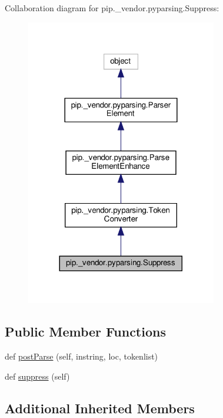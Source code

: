 Collaboration diagram for pip.\+\_\+vendor.\+pyparsing.\+Suppress\+:
\nopagebreak
\begin{figure}[H]
\begin{center}
\leavevmode
\includegraphics[width=236pt]{classpip_1_1__vendor_1_1pyparsing_1_1Suppress__coll__graph}
\end{center}
\end{figure}
\subsection*{Public Member Functions}
\begin{DoxyCompactItemize}
\item 
def \hyperlink{classpip_1_1__vendor_1_1pyparsing_1_1Suppress_af93b0acc8be9a405e027d83a8a9b6cc8}{post\+Parse} (self, instring, loc, tokenlist)
\item 
def \hyperlink{classpip_1_1__vendor_1_1pyparsing_1_1Suppress_ac74b490827cab18def697ce466c0b5fe}{suppress} (self)
\end{DoxyCompactItemize}
\subsection*{Additional Inherited Members}


